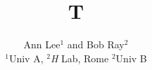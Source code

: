 \documentclass{article}
\begin{document}
\title{T}
\author{Ann Lee$^{1}$ and Bob Ray$^{2}$\\
$^{1}$Univ A, \textit{$^{2}$H} Lab, Rome $^{2}$Univ B}
\maketitle
\end{document}
